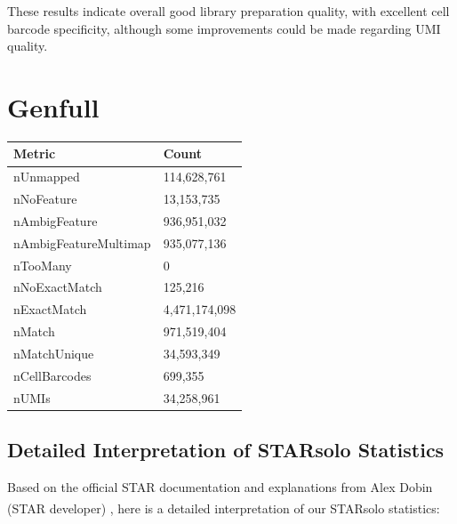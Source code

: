 \documentclass[
  11pt,
  a4paper,
]{report}
\begin{document}
These results indicate overall good library preparation quality, with
excellent cell barcode specificity, although some improvements could be
made regarding UMI quality.

\section{Genfull}\label{genfull}

\begin{table}

\caption{\label{tbl-starsolo-features}STARsolo feature mapping
statistics}

\begin{minipage}{\linewidth}

\begin{longtable}[]{@{}ll@{}}
\toprule\noalign{}
Metric & Count \\
\midrule\noalign{}
\endhead
\bottomrule\noalign{}
\endlastfoot
nUnmapped & 114,628,761 \\
nNoFeature & 13,153,735 \\
nAmbigFeature & 936,951,032 \\
nAmbigFeatureMultimap & 935,077,136 \\
nTooMany & 0 \\
nNoExactMatch & 125,216 \\
nExactMatch & 4,471,174,098 \\
nMatch & 971,519,404 \\
nMatchUnique & 34,593,349 \\
nCellBarcodes & 699,355 \\
nUMIs & 34,258,961 \\
\end{longtable}

\end{minipage}%

\end{table}%

\subsection{Detailed Interpretation of STARsolo
Statistics}\label{detailed-interpretation-of-starsolo-statistics}

Based on the official STAR documentation and explanations from Alex
Dobin (STAR developer)
\href{https://github.com/alexdobin/STAR/issues/1887}{\textsuperscript{}},
here is a detailed interpretation of our STARsolo statistics:
\end{document}

